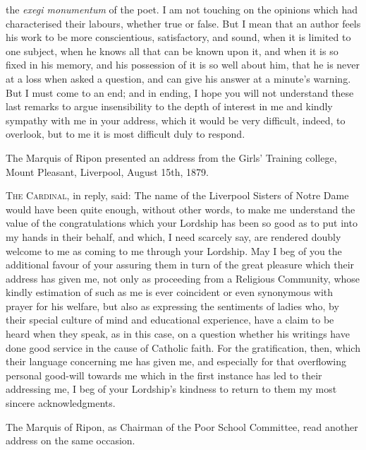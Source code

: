 the \emph{exegi monumentum} of the poet. I am not touching on the
opinions which had characterised their labours, whether true or false.
But I mean that an author feels his work to be more conscientious,
satisfactory, and sound, when it is limited to one subject, when he
knows all that can be known upon it, and when it is so fixed in his
memory, and his possession of it is so well about him, that he is
never at a loss when asked a question, and can give his answer at a
minute's warning. But I must come to an end; and in ending, I hope you
will not understand these last remarks to argue insensibility to the
depth of interest in me and kindly sympathy with me in your address,
which it would be very difficult, indeed, to overlook, but to me it is
most difficult duly to respond.


The Marquis of Ripon presented an address from
the Girls' Training college, Mount Pleasant, Liverpool, August 15th,
1879.

T\textsc{he} C\textsc{ardinal},
in reply, said: The name of the Liverpool Sisters of Notre Dame would
have been quite enough, without other words, to make me understand the
value of the congratulations which your Lordship has been so good as
to put into my hands in their behalf, and which, I need scarcely say,
are rendered doubly welcome to me as coming to me through your
Lordship. May I beg of you the additional favour of your assuring them
in turn of the great pleasure which their address has given me, not
only as proceeding from a Religious Community, whose kindly estimation
of such as me is ever coincident or even synonymous with prayer for
his welfare, but also as expressing the sentiments of ladies who, by
their special culture of mind and educational experience, have a claim
to be heard when they speak, as in this case, on a question whether
his writings have done good service in the cause of Catholic faith.
For the gratification, then, which their language concerning me has
given me, and especially for that overflowing personal good-will
towards me which in the first instance has led to their addressing me,
I beg of your Lordship's kindness to return to them my most sincere
acknowledgments.


The Marquis of Ripon, as Chairman of the Poor
School Committee, read another address on the same occasion.

